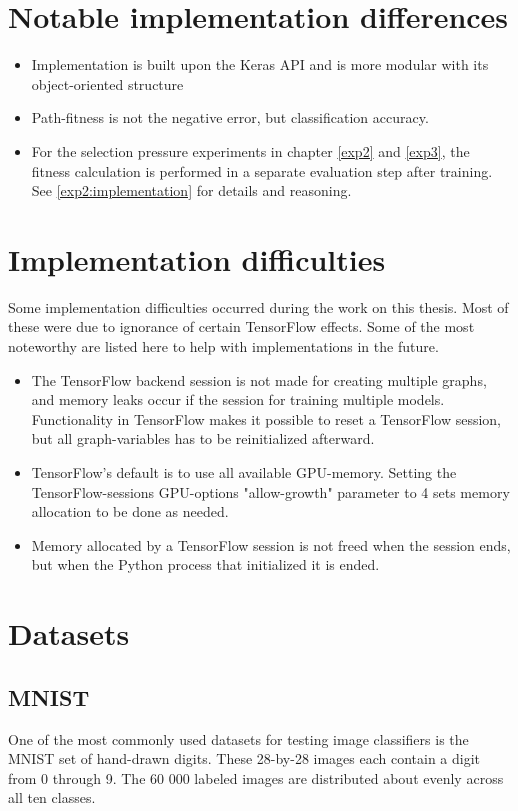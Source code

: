 \section{Notable implementation differences}
\begin{itemize}
    \item Implementation is built upon the Keras API and is more modular with its object-oriented structure
    \item Path-fitness is not the negative error, but classification accuracy. 
    \item For the selection pressure experiments in chapter \ref{exp2} and \ref{exp3}, the fitness calculation is performed in a separate evaluation step after training. See \ref{exp2:implementation} for details and reasoning.
\end{itemize}

\section{Implementation difficulties} 
\label{implementation:problems}
Some implementation difficulties occurred during the work on this thesis. Most of these were due to ignorance of certain TensorFlow effects. Some of the most noteworthy are listed here to help with implementations in the future.
\begin{itemize}
    \item The TensorFlow backend session is not made for creating multiple graphs, and memory leaks occur if the session for training multiple models. Functionality in TensorFlow makes it possible to reset a TensorFlow session, but all graph-variables has to be reinitialized afterward. 
    \item TensorFlow's default is to use all available GPU-memory. Setting the TensorFlow-sessions GPU-options "allow-growth" parameter to 4 sets memory allocation to be done as needed.
    \item Memory allocated by a TensorFlow session is not freed when the session ends, but when the Python process that initialized it is ended.
\end{itemize}

\section{Datasets}
\subsection{MNIST}\label{Implementation:MNIST}
One of the most commonly used datasets for testing image classifiers is the MNIST\cite{MNIST} set of hand-drawn digits. These 28-by-28 images each contain a digit from 0 through 9. The 60 000 labeled images are distributed about evenly across all ten classes. 


